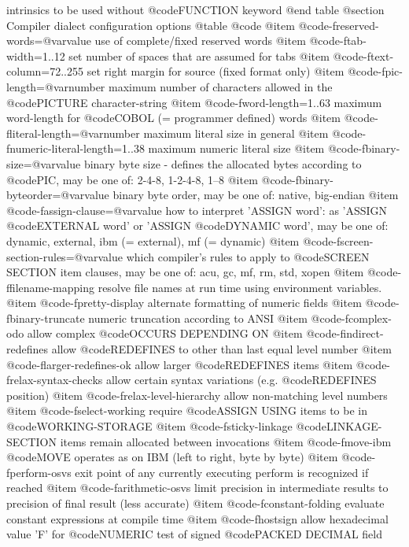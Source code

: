 intrinsics to be used without @code{FUNCTION} keyword
@end table
@section Compiler dialect configuration options
@table @code
@item @code{-freserved-words=@var{value}}
use of complete/fixed reserved words
@item @code{-ftab-width=1..12}
set number of spaces that are assumed for tabs
@item @code{-ftext-column=72..255}
set right margin for source (fixed format only)
@item @code{-fpic-length=@var{number}}
maximum number of characters allowed in the @code{PICTURE} character-string
@item @code{-fword-length=1..63}
maximum word-length for @code{COBOL} (= programmer defined) words
@item @code{-fliteral-length=@var{number}}
maximum literal size in general
@item @code{-fnumeric-literal-length=1..38}
maximum numeric literal size
@item @code{-fbinary-size=@var{value}}
binary byte size - defines the allocated bytes according to @code{PIC}, may be one of: 2-4-8, 1-2-4-8, 1--8
@item @code{-fbinary-byteorder=@var{value}}
binary byte order, may be one of: native, big-endian
@item @code{-fassign-clause=@var{value}}
how to interpret 'ASSIGN word': as 'ASSIGN @code{EXTERNAL} word' or 'ASSIGN @code{DYNAMIC} word', may be one of: dynamic, external, ibm (= external), mf (= dynamic)
@item @code{-fscreen-section-rules=@var{value}}
which compiler's rules to apply to @code{SCREEN SECTION} item clauses, may be one of: acu, gc, mf, rm, std, xopen
@item @code{-ffilename-mapping}
resolve file names at run time using environment variables.
@item @code{-fpretty-display}
alternate formatting of numeric fields
@item @code{-fbinary-truncate}
numeric truncation according to ANSI
@item @code{-fcomplex-odo}
allow complex @code{OCCURS DEPENDING ON}
@item @code{-findirect-redefines}
allow @code{REDEFINES} to other than last equal level number
@item @code{-flarger-redefines-ok}
allow larger @code{REDEFINES} items
@item @code{-frelax-syntax-checks}
allow certain syntax variations (e.g. @code{REDEFINES} position)
@item @code{-frelax-level-hierarchy}
allow non-matching level numbers
@item @code{-fselect-working}
require @code{ASSIGN USING} items to be in @code{WORKING-STORAGE}
@item @code{-fsticky-linkage}
@code{LINKAGE-SECTION} items remain allocated between invocations
@item @code{-fmove-ibm}
@code{MOVE} operates as on IBM (left to right, byte by byte)
@item @code{-fperform-osvs}
exit point of any currently executing perform is recognized if reached
@item @code{-farithmetic-osvs}
limit precision in intermediate results to precision of final result (less accurate)
@item @code{-fconstant-folding}
evaluate constant expressions at compile time
@item @code{-fhostsign}
allow hexadecimal value 'F' for @code{NUMERIC} test of signed @code{PACKED DECIMAL} field
